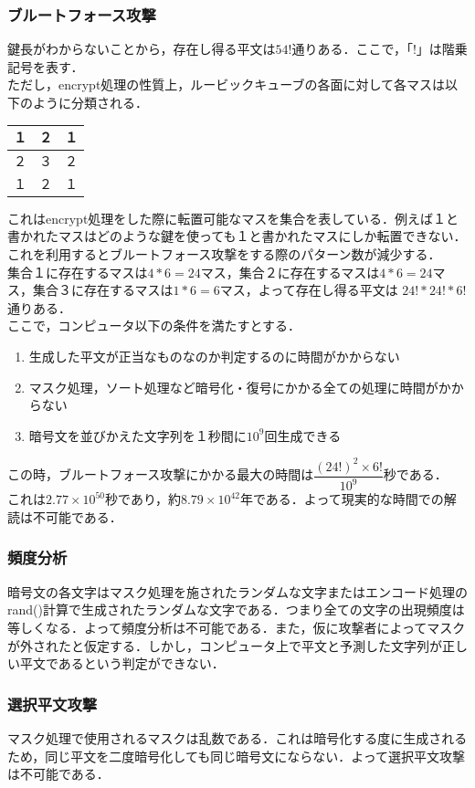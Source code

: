 \documentclass[a4p]{jarticle}
\begin{document}
\subsubsection{ブルートフォース攻撃}
鍵長がわからないことから，存在し得る平文は$54!$通りある．ここで，「$!$」は階乗記号を表す．\\
ただし，encrypt処理の性質上，ルービックキューブの各面に対して各マスは以下のように分類される．
\begin{table}[htb]
  \begin{tabular}{|l|c|r|} \hline
    １ & ２ & １ \\ \hline
    ２ & ３ & ２ \\ \hline
    １ & ２ & １ \\ \hline
  \end{tabular}
\end{table}
これはencrypt処理をした際に転置可能なマスを集合を表している．例えば１と書かれたマスはどのような鍵を使っても１と書かれたマスにしか転置できない．これを利用するとブルートフォース攻撃をする際のパターン数が減少する．\\
集合１に存在するマスは$4*6=24$マス，集合２に存在するマスは$4*6=24$マス，集合３に存在するマスは$1*6=6$マス，よって存在し得る平文は $24!*24!*6!$通りある．\\
ここで，コンピュータ以下の条件を満たすとする．
\begin{enumerate}
  \item 生成した平文が正当なものなのか判定するのに時間がかからない
  \item マスク処理，ソート処理など暗号化・復号にかかる全ての処理に時間がかからない
  \item 暗号文を並びかえた文字列を１秒間に$10^9$回生成できる
\end{enumerate}
この時，ブルートフォース攻撃にかかる最大の時間は$\dfrac{(24!)^2\times6!}{10^9}$秒である．\\
これは$2.77\times10^{50}$秒であり，約$8.79\times10^{42}$年である．よって現実的な時間での解読は不可能である．

\subsubsection{頻度分析}
暗号文の各文字はマスク処理を施されたランダムな文字またはエンコード処理のrand()計算で生成されたランダムな文字である．つまり全ての文字の出現頻度は等しくなる．よって頻度分析は不可能である．また，仮に攻撃者によってマスクが外されたと仮定する．しかし，コンピュータ上で平文と予測した文字列が正しい平文であるという判定ができない．
\subsubsection{選択平文攻撃}
マスク処理で使用されるマスクは乱数である．これは暗号化する度に生成されるため，同じ平文を二度暗号化しても同じ暗号文にならない．よって選択平文攻撃は不可能である．
\end{document}

